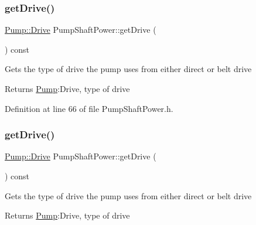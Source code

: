 \mbox{\label{class_pump_shaft_power_a3d6529d7f5ce8ef194af9abe5e6399b6}} 
\subsubsection{\texorpdfstring{get\+Drive()}{getDrive()}\hspace{0.1cm}{\footnotesize\ttfamily [2/3]}}
{\footnotesize\ttfamily \hyperlink{class_pump_a32bf0ade131a11bb3b3fb374f638e983}{Pump\+::\+Drive} Pump\+Shaft\+Power\+::get\+Drive (\begin{DoxyParamCaption}{ }\end{DoxyParamCaption}) const\hspace{0.3cm}{\ttfamily [inline]}}

Gets the type of drive the pump uses from either direct or belt drive

\begin{DoxyReturn}{Returns}
\hyperlink{class_pump}{Pump}\+:Drive, type of drive 
\end{DoxyReturn}


Definition at line 66 of file Pump\+Shaft\+Power.\+h.

\mbox{\label{class_pump_shaft_power_a3d6529d7f5ce8ef194af9abe5e6399b6}} 
\subsubsection{\texorpdfstring{get\+Drive()}{getDrive()}\hspace{0.1cm}{\footnotesize\ttfamily [3/3]}}
{\footnotesize\ttfamily \hyperlink{class_pump_a32bf0ade131a11bb3b3fb374f638e983}{Pump\+::\+Drive} Pump\+Shaft\+Power\+::get\+Drive (\begin{DoxyParamCaption}{ }\end{DoxyParamCaption}) const\hspace{0.3cm}{\ttfamily [inline]}}

Gets the type of drive the pump uses from either direct or belt drive

\begin{DoxyReturn}{Returns}
\hyperlink{class_pump}{Pump}\+:Drive, type of drive 
\end{DoxyReturn}


